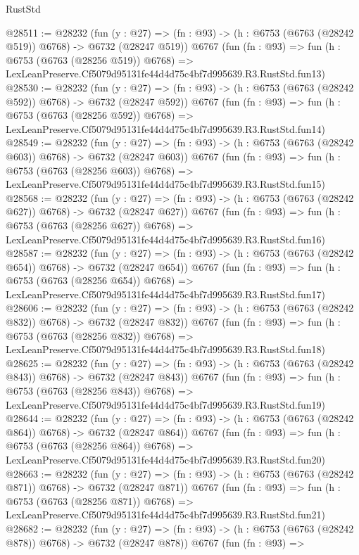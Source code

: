\begin{lexlean}{RustStd}
\begin{coremodule}
@28511 := @28232
    (fun (y : @27) => (fn : @93) -> (h : @6753 (@6763 (@28242 @519)) @6768) -> @6732 (@28247 @519))
    @6767
    (fun (fn : @93) =>
    fun (h : @6753 (@6763 (@28256 @519)) @6768) =>
    LexLeanPreserve.Cf5079d95131fe44d4d75c4bf7d995639.R3.RustStd.fun13)
@28530 := @28232
    (fun (y : @27) => (fn : @93) -> (h : @6753 (@6763 (@28242 @592)) @6768) -> @6732 (@28247 @592))
    @6767
    (fun (fn : @93) =>
    fun (h : @6753 (@6763 (@28256 @592)) @6768) =>
    LexLeanPreserve.Cf5079d95131fe44d4d75c4bf7d995639.R3.RustStd.fun14)
@28549 := @28232
    (fun (y : @27) => (fn : @93) -> (h : @6753 (@6763 (@28242 @603)) @6768) -> @6732 (@28247 @603))
    @6767
    (fun (fn : @93) =>
    fun (h : @6753 (@6763 (@28256 @603)) @6768) =>
    LexLeanPreserve.Cf5079d95131fe44d4d75c4bf7d995639.R3.RustStd.fun15)
@28568 := @28232
    (fun (y : @27) => (fn : @93) -> (h : @6753 (@6763 (@28242 @627)) @6768) -> @6732 (@28247 @627))
    @6767
    (fun (fn : @93) =>
    fun (h : @6753 (@6763 (@28256 @627)) @6768) =>
    LexLeanPreserve.Cf5079d95131fe44d4d75c4bf7d995639.R3.RustStd.fun16)
@28587 := @28232
    (fun (y : @27) => (fn : @93) -> (h : @6753 (@6763 (@28242 @654)) @6768) -> @6732 (@28247 @654))
    @6767
    (fun (fn : @93) =>
    fun (h : @6753 (@6763 (@28256 @654)) @6768) =>
    LexLeanPreserve.Cf5079d95131fe44d4d75c4bf7d995639.R3.RustStd.fun17)
@28606 := @28232
    (fun (y : @27) => (fn : @93) -> (h : @6753 (@6763 (@28242 @832)) @6768) -> @6732 (@28247 @832))
    @6767
    (fun (fn : @93) =>
    fun (h : @6753 (@6763 (@28256 @832)) @6768) =>
    LexLeanPreserve.Cf5079d95131fe44d4d75c4bf7d995639.R3.RustStd.fun18)
@28625 := @28232
    (fun (y : @27) => (fn : @93) -> (h : @6753 (@6763 (@28242 @843)) @6768) -> @6732 (@28247 @843))
    @6767
    (fun (fn : @93) =>
    fun (h : @6753 (@6763 (@28256 @843)) @6768) =>
    LexLeanPreserve.Cf5079d95131fe44d4d75c4bf7d995639.R3.RustStd.fun19)
@28644 := @28232
    (fun (y : @27) => (fn : @93) -> (h : @6753 (@6763 (@28242 @864)) @6768) -> @6732 (@28247 @864))
    @6767
    (fun (fn : @93) =>
    fun (h : @6753 (@6763 (@28256 @864)) @6768) =>
    LexLeanPreserve.Cf5079d95131fe44d4d75c4bf7d995639.R3.RustStd.fun20)
@28663 := @28232
    (fun (y : @27) => (fn : @93) -> (h : @6753 (@6763 (@28242 @871)) @6768) -> @6732 (@28247 @871))
    @6767
    (fun (fn : @93) =>
    fun (h : @6753 (@6763 (@28256 @871)) @6768) =>
    LexLeanPreserve.Cf5079d95131fe44d4d75c4bf7d995639.R3.RustStd.fun21)
@28682 := @28232
    (fun (y : @27) => (fn : @93) -> (h : @6753 (@6763 (@28242 @878)) @6768) -> @6732 (@28247 @878))
    @6767
    (fun (fn : @93) =>

\end{coremodule}
\end{lexlean}
